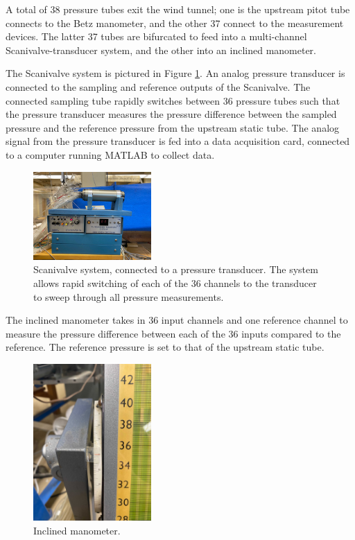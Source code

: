 \documentclass[runningheads]{llncs}
\begin{document}
\noindent
A total of 38 pressure tubes exit the wind tunnel; one is the upstream pitot tube connects to the Betz manometer, and the other 37 connect to the measurement devices. The latter 37 tubes are bifurcated to feed into a multi-channel Scanivalve-transducer system, and the other into an inclined manometer.\newline

\noindent
The Scanivalve system is pictured in Figure \ref{fig:scanivalve}. An analog pressure transducer is connected to the sampling and reference outputs of the Scanivalve. The connected sampling tube rapidly switches between 36 pressure tubes such that the pressure transducer measures the pressure difference between the sampled pressure and the reference pressure from the upstream static tube. The analog signal from the pressure transducer is fed into a data acquisition card, connected to a computer running MATLAB to collect data.\newline

\begin{figure}[h]
    \centering
    \includegraphics[width=0.4\textwidth]{Apparatus Pictures/scanivalve.jpg}
    \caption{Scanivalve system, connected to a pressure transducer. The system allows rapid switching of each of the 36 channels to the transducer to sweep through all pressure measurements.}
    \label{fig:scanivalve}
\end{figure}

\noindent
The inclined manometer takes in 36 input channels and one reference channel to measure the pressure difference between each of the 36 inputs compared to the reference. The reference pressure is set to that of the upstream static tube.

\begin{figure}[h]
    \centering
    \includegraphics[width=0.4\textwidth]{Apparatus Pictures/inclined_manometer_slope_graduations.jpg}
    \caption{Inclined manometer.}
    \label{fig:manometer}
\end{figure}
\end{document}
